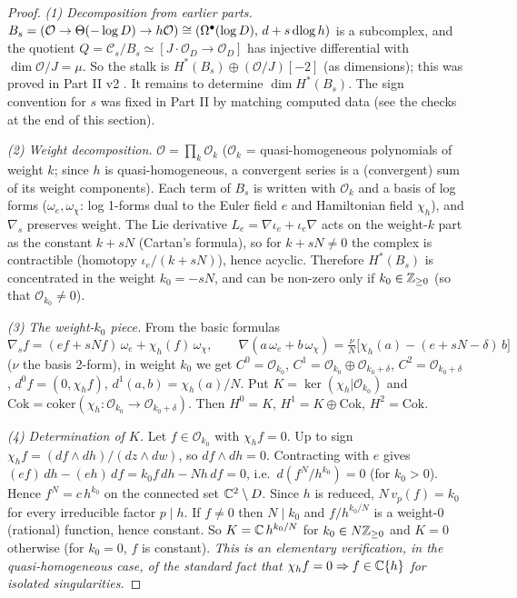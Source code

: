 \begin{proof}
\emph{(1) Decomposition from earlier parts.} $B_s=(\mathcal O\to\Theta(-\log D)\to h\mathcal O)\cong(\Omega^\bullet(\log D),\,d+s\,\mathrm{dlog}\, h)$ is a subcomplex, and the quotient $Q=\mathcal C_s/B_s\simeq[J\!\cdot\!\mathcal O_D\to\mathcal O_D]$ has injective differential with $\dim\mathcal O/J=\mu$. So the stalk is $H^*(B_s)\oplus(\mathcal O/J)[-2]$ (as dimensions); this was proved in Part II v2 \tP. It remains to determine $\dim H^*(B_s)$. The sign convention for $s$ was fixed in Part II by matching computed data (see the checks at the end of this section).

\emph{(2) Weight decomposition.} $\mathcal O=\prod_k\mathcal O_k$ ($\mathcal O_k$ = quasi-homogeneous polynomials of weight $k$; since $h$ is quasi-homogeneous, a convergent series is a (convergent) sum of its weight components). Each term of $B_s$ is written with $\mathcal O_k$ and a basis of log forms ($\omega_e,\omega_\chi$: log 1-forms dual to the Euler field $e$ and Hamiltonian field $\chi_h$), and $\nabla_s$ preserves weight. The Lie derivative $L_e=\nabla\iota_e+\iota_e\nabla$ acts on the weight-$k$ part as the constant $k+sN$ (Cartan's formula), so for $k+sN\ne0$ the complex is contractible (homotopy $\iota_e/(k+sN)$), hence acyclic. Therefore $H^*(B_s)$ is concentrated in the weight $k_0=-sN$, and can be non-zero only if $k_0\in\mathbb Z_{\ge0}$ (so that $\mathcal O_{k_0}\ne0$).

\emph{(3) The weight-$k_0$ piece.} From the basic formulas
\[\nabla_sf=(ef+sNf)\,\omega_e+\chi_h(f)\,\omega_\chi,\qquad\nabla(a\,\omega_e+b\,\omega_\chi)=\tfrac{\nu}{N}\bigl[\chi_h(a)-(e+sN-\delta)\,b\bigr]\]
($\nu$ the basis 2-form), in weight $k_0$ we get $C^0=\mathcal O_{k_0}$, $C^1=\mathcal O_{k_0}\oplus\mathcal O_{k_0+\delta}$, $C^2=\mathcal O_{k_0+\delta}$, $d^0f=(0,\chi_hf)$, $d^1(a,b)=\chi_h(a)/N$. Put $K=\ker(\chi_h|\mathcal O_{k_0})$ and $\mathrm{Cok}=\mathrm{coker}(\chi_h:\mathcal O_{k_0}\to\mathcal O_{k_0+\delta})$. Then $H^0=K$, $H^1=K\oplus\mathrm{Cok}$, $H^2=\mathrm{Cok}$.

\emph{(4) Determination of $K$.} Let $f\in\mathcal O_{k_0}$ with $\chi_hf=0$. Up to sign $\chi_hf=(df\wedge dh)/(dz\wedge dw)$, so $df\wedge dh=0$. Contracting with $e$ gives $(ef)\,dh-(eh)\,df=k_0f\,dh-Nh\,df=0$, i.e.\ $d(f^N/h^{k_0})=0$ (for $k_0>0$). Hence $f^N=c\,h^{k_0}$ on the connected set $\mathbb C^2\setminus D$. Since $h$ is reduced, $N\,v_p(f)=k_0$ for every irreducible factor $p\mid h$. If $f\ne0$ then $N\mid k_0$ and $f/h^{k_0/N}$ is a weight-$0$ (rational) function, hence constant. So $K=\mathbb C\,h^{k_0/N}$ for $k_0\in N\mathbb Z_{\ge0}$ and $K=0$ otherwise (for $k_0=0$, $f$ is constant). \emph{This is an elementary verification, in the quasi-homogeneous case, of the standard fact that $\chi_hf=0\Rightarrow f\in\mathbb C\{h\}$ for isolated singularities.}


\end{proof}

